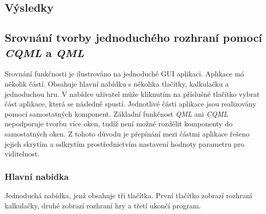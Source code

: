 \documentclass[11pt,twoside,a4paper]{book}
\begin{document}
{{\begin{ttemize}
{{\begin{lastlisting}[frame=single,caption=Řešení v pseudokódu problematického použití operátoru "." v přiřazovacím výroku,label=lst:var0N]
\chapter{\label{CH:conc}Výsledky}
\section{\label{SEC:Conclusion}Srovnání tvorby jednoduchého rozhraní pomocí \textit{CQML} a \textit{QML}}
Srovnání funkčnosti je ilustrováno na jednoduché GUI aplikaci. Aplikace má několik částí. Obsahuje hlavní nabídku s několika tlačítky, kalkulačku a jednoduchou hru. V nabídce uživatel může kliknutím na příslušné tlačítko vybrat část aplikace, která se následně spustí.
Jednotlivé části aplikace jsou realizovány pomocí samostatných komponent. Základní funkčnost \textit{QML} ani \textit{CQML} nepodporuje tvorbu více oken, tudíž není možné rozdělit komponenty do samostatných oken. Z tohoto důvodu je přepínání mezi částmi aplikace řešeno jejich skrytím a odkrytím prostřednictvím nastavení hodnoty parametru pro viditelnost.
\subsection{Hlavní nabídka}
Jednoduchá nabídka, jenž obsahuje tři tlačítka. První tlačítko zobrazí rozhraní kalkulačky, druhé zobrazí rozhraní hry a třetí ukončí program.

\end{lastlisting}}}
\end{ttemize}}}
\end{document}
